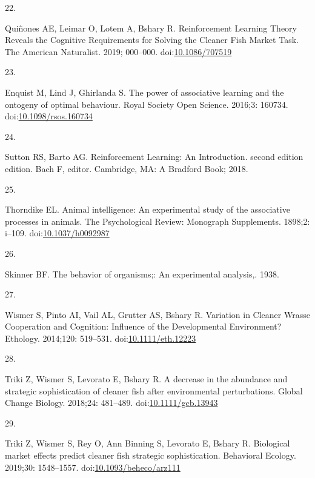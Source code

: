 \documentclass[10pt,letterpaper]{article}
\newlength{\cslhangindent}
\newlength{\csllabelwidth}
\newlength{\cslentryspacingunit} %
\newenvironment{CSLReferences}[2] %
 {%
  \setlength{\parindent}{0pt}
  \ifodd #1
  \let\oldpar\par
  \def\par{\hangindent=\cslhangindent\oldpar}
  \fi
  \setlength{\parskip}{#2\cslentryspacingunit}
 }%
 {}
\newcommand{\CSLLeftMargin}[1]{\parbox[t]{\csllabelwidth}{#1}}
\newcommand{\CSLRightInline}[1]{\parbox[t]{\linewidth - \csllabelwidth}{#1}\break}
\begin{document}
\begin{CSLReferences}{0}{0}
\leavevmode{}%
\CSLLeftMargin{22. }
\CSLRightInline{Quiñones AE, Leimar O, Lotem A, Bshary R. Reinforcement
{Learning} {Theory} {Reveals} the {Cognitive} {Requirements} for
{Solving} the {Cleaner} {Fish} {Market} {Task}. The American Naturalist.
2019; 000--000.
doi:\href{https://doi.org/10.1086/707519}{10.1086/707519}}

\leavevmode{}%
\CSLLeftMargin{23. }
\CSLRightInline{Enquist M, Lind J, Ghirlanda S. The power of associative
learning and the ontogeny of optimal behaviour. Royal Society Open
Science. 2016;3: 160734.
doi:\href{https://doi.org/10.1098/rsos.160734}{10.1098/rsos.160734}}

\leavevmode{}%
\CSLLeftMargin{24. }
\CSLRightInline{Sutton RS, Barto AG. Reinforcement {Learning}: {An}
{Introduction}. second edition edition. Bach F, editor. Cambridge, MA: A
Bradford Book; 2018. }

\leavevmode{}%
\CSLLeftMargin{25. }
\CSLRightInline{Thorndike EL. Animal intelligence: {An} experimental
study of the associative processes in animals. The Psychological Review:
Monograph Supplements. 1898;2: i--109.
doi:\href{https://doi.org/10.1037/h0092987}{10.1037/h0092987}}

\leavevmode{}%
\CSLLeftMargin{26. }
\CSLRightInline{Skinner BF. The behavior of organisms;: {An}
experimental analysis,. 1938. }

\leavevmode{}%
\CSLLeftMargin{27. }
\CSLRightInline{Wismer S, Pinto AI, Vail AL, Grutter AS, Bshary R.
Variation in {Cleaner} {Wrasse} {Cooperation} and {Cognition}:
{Influence} of the {Developmental} {Environment}? Ethology. 2014;120:
519--531.
doi:\href{https://doi.org/10.1111/eth.12223}{10.1111/eth.12223}}

\leavevmode{}%
\CSLLeftMargin{28. }
\CSLRightInline{Triki Z, Wismer S, Levorato E, Bshary R. A decrease in
the abundance and strategic sophistication of cleaner fish after
environmental perturbations. Global Change Biology. 2018;24: 481--489.
doi:\href{https://doi.org/10.1111/gcb.13943}{10.1111/gcb.13943}}

\leavevmode{}%
\CSLLeftMargin{29. }
\CSLRightInline{Triki Z, Wismer S, Rey O, Ann Binning S, Levorato E,
Bshary R. Biological market effects predict cleaner fish strategic
sophistication. Behavioral Ecology. 2019;30: 1548--1557.
doi:\href{https://doi.org/10.1093/beheco/arz111}{10.1093/beheco/arz111}}


\end{CSLReferences}
\end{document}
